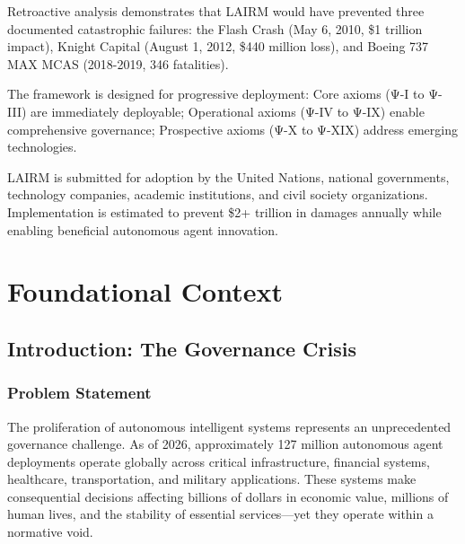\documentclass[12pt,a4paper,twoside,openright]{book}
\begin{document}
Retroactive analysis demonstrates that LAIRM would have prevented three documented catastrophic failures: the Flash Crash (May 6, 2010, \$1 trillion impact), Knight Capital (August 1, 2012, \$440 million loss), and Boeing 737 MAX MCAS (2018-2019, 346 fatalities).

The framework is designed for progressive deployment: Core axioms (Ψ-I to Ψ-III) are immediately deployable; Operational axioms (Ψ-IV to Ψ-IX) enable comprehensive governance; Prospective axioms (Ψ-X to Ψ-XIX) address emerging technologies.

LAIRM is submitted for adoption by the United Nations, national governments, technology companies, academic institutions, and civil society organizations. Implementation is estimated to prevent \$2+ trillion in damages annually while enabling beneficial autonomous agent innovation.

\cleardoublepage

\tableofcontents

\cleardoublepage
\listoffigures

\cleardoublepage
\listoftables

\mainmatter
\pagestyle{fancy}

\part{Foundational Context}

\chapter{Introduction: The Governance Crisis}
\label{ch:introduction}

\section{Problem Statement}

The proliferation of autonomous intelligent systems represents an unprecedented governance challenge. As of 2026, approximately 127 million autonomous agent deployments operate globally across critical infrastructure, financial systems, healthcare, transportation, and military applications. These systems make consequential decisions affecting billions of dollars in economic value, millions of human lives, and the stability of essential services—yet they operate within a normative void.
\end{document}
